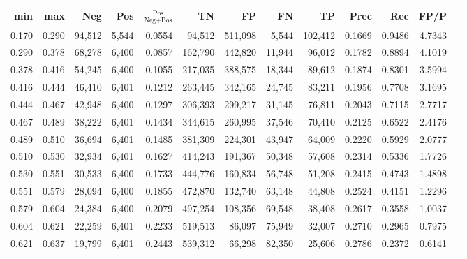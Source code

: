 \begin{tabular}{rrrrrrrrrrrrr}
\toprule
  min &   max &    Neg &   Pos & $\frac{\text{Pos}}{\text{Neg}+\text{Pos}}$ &      TN &      FP &      FN &      TP &   Prec &    Rec &   FP/P \\
\midrule
0.170 & 0.290 & 94,512 & 5,544 &                                     0.0554 &  94,512 & 511,098 &   5,544 & 102,412 & 0.1669 & 0.9486 & 4.7343 \\
0.290 & 0.378 & 68,278 & 6,400 &                                     0.0857 & 162,790 & 442,820 &  11,944 &  96,012 & 0.1782 & 0.8894 & 4.1019 \\
0.378 & 0.416 & 54,245 & 6,400 &                                     0.1055 & 217,035 & 388,575 &  18,344 &  89,612 & 0.1874 & 0.8301 & 3.5994 \\
0.416 & 0.444 & 46,410 & 6,401 &                                     0.1212 & 263,445 & 342,165 &  24,745 &  83,211 & 0.1956 & 0.7708 & 3.1695 \\
0.444 & 0.467 & 42,948 & 6,400 &                                     0.1297 & 306,393 & 299,217 &  31,145 &  76,811 & 0.2043 & 0.7115 & 2.7717 \\
0.467 & 0.489 & 38,222 & 6,401 &                                     0.1434 & 344,615 & 260,995 &  37,546 &  70,410 & 0.2125 & 0.6522 & 2.4176 \\
0.489 & 0.510 & 36,694 & 6,401 &                                     0.1485 & 381,309 & 224,301 &  43,947 &  64,009 & 0.2220 & 0.5929 & 2.0777 \\
0.510 & 0.530 & 32,934 & 6,401 &                                     0.1627 & 414,243 & 191,367 &  50,348 &  57,608 & 0.2314 & 0.5336 & 1.7726 \\
0.530 & 0.551 & 30,533 & 6,400 &                                     0.1733 & 444,776 & 160,834 &  56,748 &  51,208 & 0.2415 & 0.4743 & 1.4898 \\
0.551 & 0.579 & 28,094 & 6,400 &                                     0.1855 & 472,870 & 132,740 &  63,148 &  44,808 & 0.2524 & 0.4151 & 1.2296 \\
0.579 & 0.604 & 24,384 & 6,400 &                                     0.2079 & 497,254 & 108,356 &  69,548 &  38,408 & 0.2617 & 0.3558 & 1.0037 \\
0.604 & 0.621 & 22,259 & 6,401 &                                     0.2233 & 519,513 &  86,097 &  75,949 &  32,007 & 0.2710 & 0.2965 & 0.7975 \\
0.621 & 0.637 & 19,799 & 6,401 &                                     0.2443 & 539,312 &  66,298 &  82,350 &  25,606 & 0.2786 & 0.2372 & 0.6141 \\

\end{tabular}
